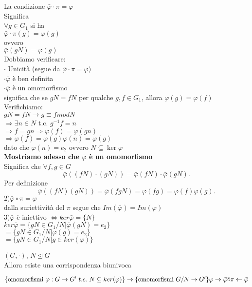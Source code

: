 \documentclass[12px]{article}
\begin{document}
	  \begin{dimo}
	  	La condizione $\bar \varphi \cdot \pi = \varphi$\\
		Significa\\
		$\forall g\in G_1$ si ha \\
		$\bar \varphi\cdot \pi(g) = \varphi(g)$\\
		ovvero\\
		$ \bar \varphi(gN) = \varphi(g)$\\
		Dobbiamo verificare:\\
		$\cdot $ Unicità (segue da $\bar \varphi\cdot \pi = \varphi)$\\
		$\cdot \bar \varphi$  è ben definita\\
		$\cdot \bar \varphi$ è un omomorfismo\\
		significa che se $gN=fN$ per qualche $g,f\in G_1$, allora $ \varphi(g) = \varphi(f)$\\
		Verifichiamo:\\
		$gN = fN \rightarrow g\equiv f mod N$\\
		$ \Rightarrow \exists n\in N$ t.c. $g^{-1}f = n$\\
		 $ \Rightarrow f=gn \Rightarrow \varphi(f) = \varphi(gn)$ \\
		 $ \Rightarrow \varphi(f) = \varphi(g) \varphi(n) = \varphi(g)$ \\
		 dato che $ \varphi(n) = e_2$ ovvero $N\subseteq\ker \varphi$\\
		 \textbf{Mostriamo adesso che $\bar \varphi$ è un omomorfismo}\\
		 Significa che $\forall f,g\in G$\\
		  \[
		 \bar \varphi((fN)\cdot (gN)) = \bar \varphi(fN)\cdot \bar\varphi(gN)
		 .\] 
		 Per definizione\\
		 \[
		 \bar\varphi ((fN)(gN)) = \bar \varphi(fgN) = \varphi(fg) = \varphi(f) \varphi(g)
		 .\] 
		 $2) \bar \varphi\circ \pi = \varphi$\\
		 dalla suriettività del $\pi$ segue che  $Im(\bar  \varphi) = Im ( \varphi)$\\
		 $3) \bar \varphi$ è iniettivo $ \Leftrightarrow ker \bar \varphi = \lbrace N\rbrace$\\
		 $ker\bar \varphi = \lbrace gN\in G_1/N | \bar \varphi(gN) = e_2\rbrace$\\
		 $=\lbrace gN\in G_1/N | \varphi(g) = e_2\rbrace$\\
		 $=\lbrace gN\in G_1/N | g\in ker( \varphi)\rbrace$
	  \end{dimo}
	  \begin{coro}
	  	$(G,\cdot)$, $N\trianglelefteq G$\\
		Allora esiste una corrispondenza biunivoca\\
		\begin{center}
			$
			 \lbrace \text{omomorfismi } \varphi:G \rightarrow G' \ t.c. \ N\subseteq ker( \varphi)\rbrace \rightarrow \lbrace \text{omomorfismi }G/N \rightarrow G'\rbrace\\
			 \varphi \rightarrow \bar \varphi\\
			 \bar\circ \pi \leftarrow \bar \varphi
			 $
		\end{center}
	  \end{coro}
\end{document}
